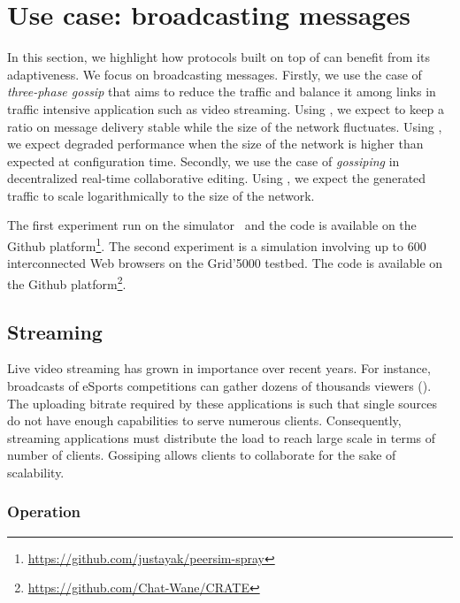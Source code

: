
\section{Use case: broadcasting messages}


In this section, we highlight how protocols built on top of \SPRAY can benefit
from its adaptiveness. We focus on broadcasting messages. Firstly, we use the
case of \emph{three-phase gossip} that aims to reduce the traffic and balance it
among links in traffic intensive application such as video streaming. Using
\SPRAY, we expect to keep a ratio on message delivery stable while the size of
the network fluctuates. Using \CYCLON, we expect degraded performance when the
size of the network is higher than expected at configuration time. Secondly, we
use the case of \emph{gossiping} in decentralized real-time collaborative
editing. Using \SPRAY, we expect the generated traffic to scale logarithmically
to the size of the network.

The first experiment run on the \PEERSIM simulator~\cite{montresor2009peersim}
and the code is available on the Github
platform\footnote{\url{https://github.com/justayak/peersim-spray}}. The second
experiment is a simulation involving up to 600 interconnected Web browsers on
the Grid'5000 testbed. The code is available on the Github
platform\footnote{\url{https://github.com/Chat-Wane/CRATE}}.

\subsection{Streaming}

Live video streaming has grown in importance over recent years. For instance,
broadcasts of eSports competitions can gather dozens of thousands viewers
(\REF). The uploading bitrate required by these applications is such that single
sources do not have enough capabilities to serve numerous clients.
Consequently, streaming applications must distribute the load to reach large
scale in terms of number of clients. Gossiping allows clients to collaborate for
the sake of scalability.

\subsubsection{Operation}

